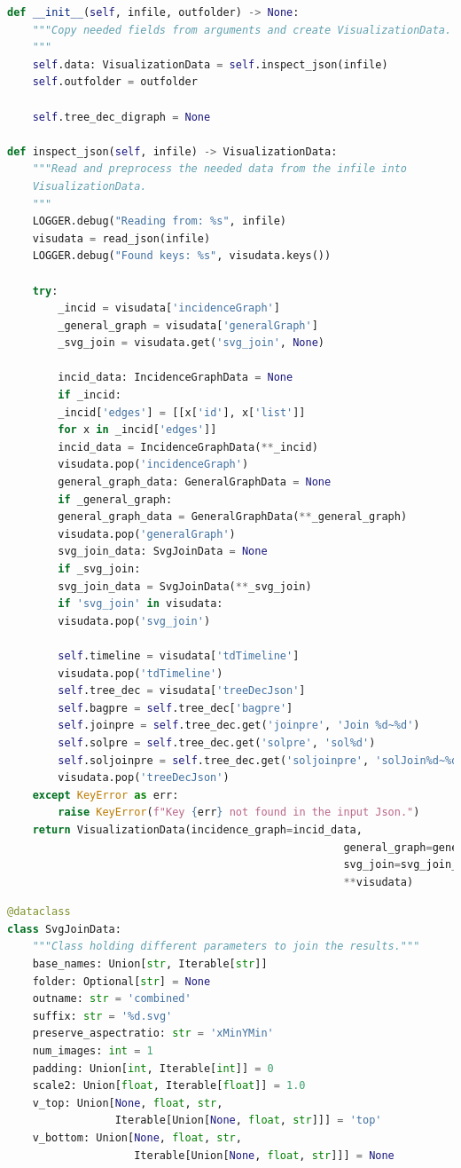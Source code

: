 \documentclass[a4paper, 12pt]{scrartcl}
\begin{document}
\begin{lstlisting}[language={Python}, caption={Initializing a Visualization object}, label={lst:visuinit}]
def __init__(self, infile, outfolder) -> None:
	"""Copy needed fields from arguments and create VisualizationData.
	"""
	self.data: VisualizationData = self.inspect_json(infile)
	self.outfolder = outfolder
	
	self.tree_dec_digraph = None
	
def inspect_json(self, infile) -> VisualizationData:
	"""Read and preprocess the needed data from the infile into 
	VisualizationData.
	"""
	LOGGER.debug("Reading from: %s", infile)
	visudata = read_json(infile)
	LOGGER.debug("Found keys: %s", visudata.keys())
	
	try:
		_incid = visudata['incidenceGraph']
		_general_graph = visudata['generalGraph']
		_svg_join = visudata.get('svg_join', None)
		
		incid_data: IncidenceGraphData = None
		if _incid:
		_incid['edges'] = [[x['id'], x['list']]
		for x in _incid['edges']]
		incid_data = IncidenceGraphData(**_incid)
		visudata.pop('incidenceGraph')
		general_graph_data: GeneralGraphData = None
		if _general_graph:
		general_graph_data = GeneralGraphData(**_general_graph)
		visudata.pop('generalGraph')
		svg_join_data: SvgJoinData = None
		if _svg_join:
		svg_join_data = SvgJoinData(**_svg_join)
		if 'svg_join' in visudata:
		visudata.pop('svg_join')
		
		self.timeline = visudata['tdTimeline']
		visudata.pop('tdTimeline')
		self.tree_dec = visudata['treeDecJson']
		self.bagpre = self.tree_dec['bagpre']
		self.joinpre = self.tree_dec.get('joinpre', 'Join %d~%d')
		self.solpre = self.tree_dec.get('solpre', 'sol%d')
		self.soljoinpre = self.tree_dec.get('soljoinpre', 'solJoin%d~%d')
		visudata.pop('treeDecJson')
	except KeyError as err:
		raise KeyError(f"Key {err} not found in the input Json.")
	return VisualizationData(incidence_graph=incid_data,
													 general_graph=general_graph_data,
													 svg_join=svg_join_data,
													 **visudata)

\end{lstlisting}

\begin{lstlisting}[language={Python}, caption={SvgJoinData}, label={lst:svgjoindata}]
@dataclass
class SvgJoinData:
	"""Class holding different parameters to join the results."""
	base_names: Union[str, Iterable[str]]
	folder: Optional[str] = None
	outname: str = 'combined'
	suffix: str = '%d.svg'
	preserve_aspectratio: str = 'xMinYMin'
	num_images: int = 1
	padding: Union[int, Iterable[int]] = 0
	scale2: Union[float, Iterable[float]] = 1.0
	v_top: Union[None, float, str, 
	             Iterable[Union[None, float, str]]] = 'top'
	v_bottom: Union[None, float, str, 
	                Iterable[Union[None, float, str]]] = None	
\end{lstlisting}
\end{document}
